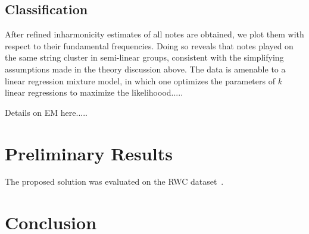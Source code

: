 \documentclass[12pt]{cmuthesis}
\begin{document}
\section{Classification}

After refined inharmonicity estimates of all notes are obtained, we plot them with respect to their fundamental frequencies. Doing so reveals that notes played on the same string cluster in semi-linear groups, consistent with the simplifying assumptions made in the theory discussion above. The data is amenable to a linear regression mixture model, in which one optimizes the parameters of ${k}$ linear regressions to maximize the likelihoood..... ~\cite{faria2010}

Details on EM here.....

\singlespacing

\chapter{Preliminary Results}
The proposed solution was evaluated on the RWC dataset~\cite{goto2003}. 

\chapter{Conclusion}

%

\backmatter


\renewcommand{\bibsection}{\chapter{\bibname}}

\end{document}
